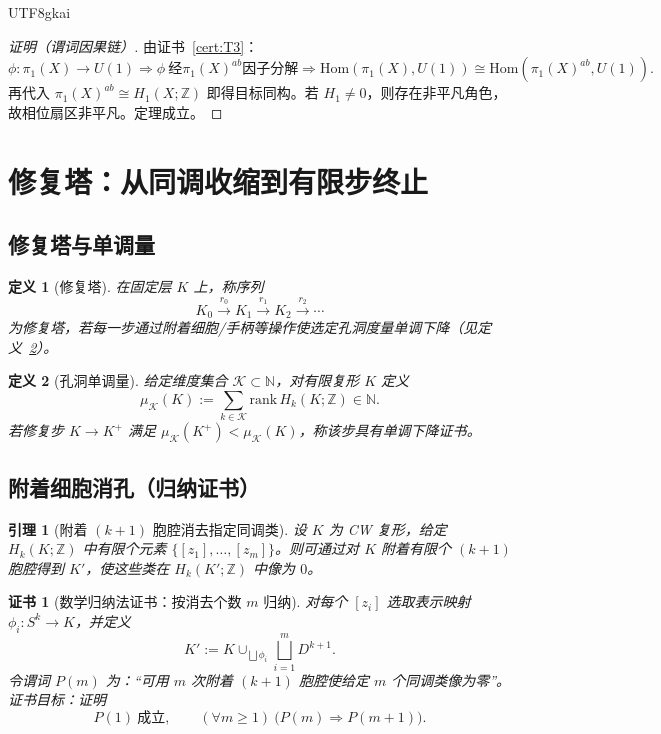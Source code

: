 \documentclass[12pt]{article}
\newtheorem{definition}{定义}[section]
\newtheorem{lemma}{引理}[section]
\newtheorem{Certificate}{证书}[section]
\begin{document}
\begin{CJK*}{UTF8}{gkai}
\begin{proof}[证明（谓词因果链）]
由证书~\ref{cert:T3}：
\[
\phi:\pi_1(X)\to U(1)
\Rightarrow
\phi\ \text{经}\pi_1(X)^{ab}\text{因子分解}
\Rightarrow
\mathrm{Hom}(\pi_1(X),U(1))\cong \mathrm{Hom}(\pi_1(X)^{ab},U(1)).
\]
再代入 $\pi_1(X)^{ab}\cong H_1(X;\mathbb Z)$ 即得目标同构。若 $H_1\neq 0$，则存在非平凡角色，故相位扇区非平凡。定理成立。
\end{proof}

\clearpage
\section{修复塔：从同调收缩到有限步终止}

\subsection{修复塔与单调量}

\begin{definition}[修复塔]
\label{def:D6}
在固定层 $K$ 上，称序列
\[
K_0 \xrightarrow{r_0} K_1 \xrightarrow{r_1} K_2 \xrightarrow{r_2}\cdots
\]
为\emph{修复塔}，若每一步通过附着细胞/手柄等操作使选定孔洞度量单调下降（见定义~\ref{def:D7}）。
\end{definition}

\begin{definition}[孔洞单调量]
\label{def:D7}
给定维度集合 $\mathcal K\subset\mathbb N$，对有限复形 $K$ 定义
\[
\mu_{\mathcal K}(K):=\sum_{k\in\mathcal K}\mathrm{rank}\,H_k(K;\mathbb Z)\in\mathbb N.
\]
若修复步 $K\to K^+$ 满足 $\mu_{\mathcal K}(K^+)<\mu_{\mathcal K}(K)$，称该步具有\emph{单调下降证书}。
\end{definition}

\subsection{附着细胞消孔（归纳证书）}

\begin{lemma}[附着 $(k+1)$ 胞腔消去指定同调类]
\label{lem:L1}
设 $K$ 为 CW 复形，给定 $H_k(K;\mathbb Z)$ 中有限个元素 $\{[z_1],\dots,[z_m]\}$。则可通过对 $K$ 附着有限个 $(k+1)$ 胞腔得到 $K'$，使这些类在 $H_k(K';
  \mathbb Z)$ 中像为 $0$。
\end{lemma}

\begin{Certificate}[数学归纳法证书：按消去个数 $m$ 归纳]
\label{cert:L1}
对每个 $[z_i]$ 选取表示映射 $\phi_i:S^k\to K$，并定义
\[
K':=K\cup_{\bigsqcup\phi_i}\bigsqcup_{i=1}^m D^{k+1}.
\]
令谓词 $P(m)$ 为：“可用 $m$ 次附着 $(k+1)$ 胞腔使给定 $m$ 个同调类像为零”。
证书目标：证明
\[
P(1)\ \text{成立},\qquad (\forall m\ge 1)\ \bigl(P(m)\Rightarrow P(m+1)\bigr).
\]
\end{Certificate}


\end{CJK*}
\end{document}
